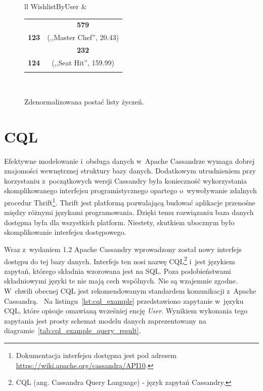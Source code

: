 \begin{figure}[ht!]
	\centering

	\begin{tabular}{ll}
		WishlistByUser &
		\begin{tabular}{|l||c|}
			\hhline{|-||-|}
			& \textbf{579} \\
			\hhline{|~||=|}
			\textbf{123} & (,,Master Chef'', 20.43) \\
			\hhline{=::=}
			& \textbf{232} \\
			\hhline{|~||=|}
			\textbf{124} & (,,Seat Hit'', 159.99) \\
			\hhline{|-||-|}
		\end{tabular} \\
	\end{tabular}

	\caption{Zdenormalizowana postać listy życzeń.}
	\label{tab:denormalized_wishlist}
\end{figure}

\section{CQL}
\label{sec:about_cql}

Efektywne modelowanie i~obsługa danych w~Apache Cassandrze wymaga dobrej znajomości wewnętrznej struktury bazy danych. Dodatkowym utrudnieniem przy korzystaniu z~początkowych wersji Cassandry była konieczność wykorzystania skomplikowanego interfejsu programistycznego opartego o~wywoływanie zdalnych procedur Thrift\footnote{Dokumentacja interfejsu dostępna jest pod adresem \url{https://wiki.apache.org/cassandra/API10}.}. Thrift jest platformą pozwalającą budować aplikacje przenośne między różnymi językami programowania. Dzięki temu rozwiązaniu baza danych dostępna była dla wszystkich platform. Niestety, skutkiem ubocznym było skomplikowanie interfejsu dostępowego.

Wraz z~wydaniem 1.2 Apache Cassandry wprowadzony został nowy interfejs dostępu do tej bazy danych. Interfejs ten nosi nazwę CQL\footnote{CQL (ang. Cassandra Query Language) - język zapytań Cassandry.} i~jest językiem zapytań, którego składnia wzorowana jest na SQL. Poza podobieństwami składniowymi języki te nie mają cech wspólnych. Nie są wzajemnie zgodne. W~chwili obecnej CQL jest rekomendowanym standardem komunikacji z~Apache Cassandrą.~\cite{cql_preferred_over_thrift} Na listingu~\ref{lst:cql_example} przedstawiono zapytanie w~języku CQL, które opisuje omawianą wcześniej encję \emph{User}. Wynikiem wykonania tego zapytania jest prosty schemat modelu danych zaprezentowany na diagramie~\ref{tab:cql_example_query_result}.


